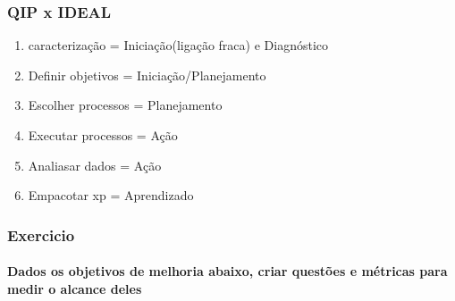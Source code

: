\documentclass{article}
\begin{document}
\subsubsection{QIP x IDEAL}

	\begin{enumerate}
	\item caracterização = Iniciação(ligação fraca) e Diagnóstico
	\item Definir objetivos = Iniciação/Planejamento
	\item Escolher processos = Planejamento
	\item Executar processos = Ação
	\item Analiasar dados = Ação
	\item Empacotar xp = Aprendizado

	\end{enumerate}
\subsubsection{Exercicio}

\paragraph{Dados os objetivos de melhoria abaixo, criar questões e métricas para medir o alcance deles} 
\end{document}
